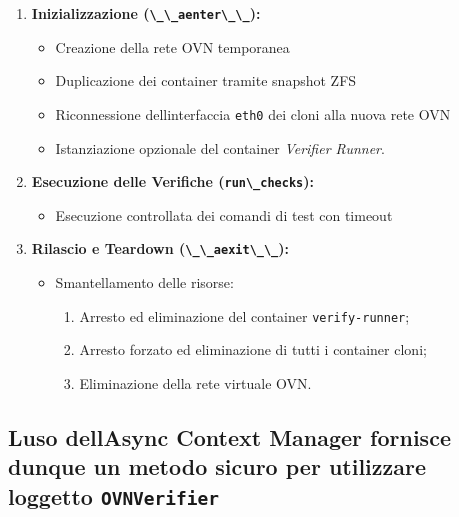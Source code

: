 \begin{enumerate}
\def\labelenumi{\arabic{enumi}.}
\tightlist
\item
  \textbf{Inizializzazione (\passthrough{\lstinline!\_\_aenter\_\_!}):}

  \begin{itemize}
  \tightlist
  \item
    Creazione della rete OVN temporanea
  \item
    Duplicazione dei container tramite snapshot ZFS
  \item
    Riconnessione dell\textquotesingle interfaccia
    \passthrough{\lstinline!eth0!} dei cloni alla nuova rete OVN
  \item
    Istanziazione opzionale del container \emph{Verifier Runner}.
  \end{itemize}
\item
  \textbf{Esecuzione delle Verifiche
  (\passthrough{\lstinline!run\_checks!}):}

  \begin{itemize}
  \tightlist
  \item
    Esecuzione controllata dei comandi di test con timeout
  \end{itemize}
\item
  \textbf{Rilascio e Teardown
  (\passthrough{\lstinline!\_\_aexit\_\_!}):}

  \begin{itemize}
  \tightlist
  \item
    Smantellamento delle risorse:

    \begin{enumerate}
    \def\labelenumii{\arabic{enumii}.}
    \tightlist
    \item
      Arresto ed eliminazione del container
      \passthrough{\lstinline!verify-runner!};
    \item
      Arresto forzato ed eliminazione di tutti i container cloni;
    \item
      Eliminazione della rete virtuale OVN.
    \end{enumerate}
  \end{itemize}
\end{enumerate}

\subsection{\texorpdfstring{L\textquotesingle uso
dell\textquotesingle{}\textbf{Async Context Manager} fornisce dunque un
metodo sicuro per utilizzare l\textquotesingle oggetto
\texttt{OVNVerifier}}{L\textquotesingle uso dell\textquotesingle Async Context Manager fornisce dunque un metodo sicuro per utilizzare l\textquotesingle oggetto OVNVerifier}}\label{luso-dellasync-context-manager-fornisce-dunque-un-metodo-sicuro-per-utilizzare-loggetto-ovnverifier}

